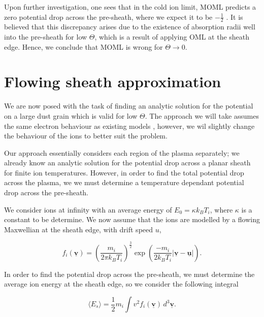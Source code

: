 \documentclass{article}
\begin{document}
Upon further investigation, one sees that in the cold ion limit, MOML
predicts a zero potential drop across the pre-sheath, where we expect it to be $-\frac{1}{2}$ \cite{Stangeby1986}.
It is believed that this discrepancy arises due to the existence of absorption radii well into
the pre-sheath for low $\Theta$, which is a result of applying OML at the sheath edge. 
Hence, we conclude that MOML is wrong for $\Theta \to 0$.

\section{Flowing sheath approximation}

We are now posed with the task of finding an analytic solution for the
potential on a large dust grain which is valid for low $\Theta$. The approach we will
take assumes the same electron behaviour as existing models \cite{Willis}, however, we wil slightly
change the behaviour of the ions to better suit the problem.

\smallskip

Our approach essentially considers each region of the plasma separately; we
already know an analytic solution for the potential drop across a planar sheath
for finite ion temperatures. However, in order to find the total potential drop across the plasma, we 
we must determine a temperature dependant potential drop across the pre-sheath.

\medskip 

We consider ions at infinity with an average energy of $E_0 = \kappa k_B T_i$, where
$\kappa$ is a constant to be determine. We now assume that the ions are modelled by a flowing 
Maxwellian at the sheath edge, with drift speed $u$,

\begin{equation}\label{FlowingMaxwellian}
f_i(\underline{\mathbf{v}}) = \left(\frac{m_i}{2\pi k_B T_i}\right)^{\frac{3}{2}} 
\exp{\left(\frac{-m_i}{2k_B T_i}|\underline{\mathbf{v}} - \underline{\mathbf{u}}|\right)}.
\end{equation}

\smallskip

In order to find the potential drop across the pre-sheath,
we must determine the average ion energy at the sheath edge, so we consider the following 
integral 

\begin{equation}\label{eq:Int1}
\langle E_{s} \rangle = \frac{1}{2}m_i \int v^2f_i(\underline{\mathbf{v}}) \,d^3 \underline{\mathbf{v}}.
\end{equation}
\end{document}
